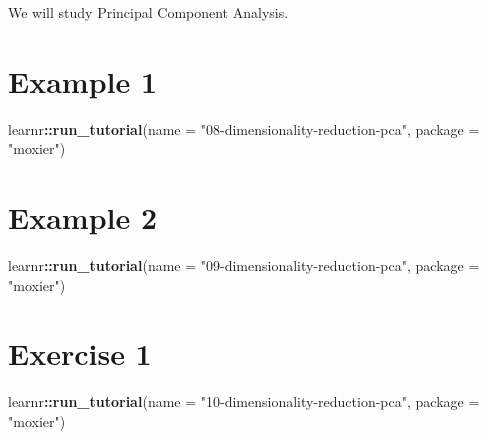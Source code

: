 \documentclass[]{book}
\newenvironment{Shaded}{\begin{snugshade}}{\end{snugshade}}
\newcommand{\KeywordTok}[1]{\textcolor[rgb]{0.13,0.29,0.53}{\textbf{#1}}}
\newcommand{\DataTypeTok}[1]{\textcolor[rgb]{0.13,0.29,0.53}{#1}}
\newcommand{\StringTok}[1]{\textcolor[rgb]{0.31,0.60,0.02}{#1}}
\newcommand{\OperatorTok}[1]{\textcolor[rgb]{0.81,0.36,0.00}{\textbf{#1}}}
\newcommand{\NormalTok}[1]{#1}
\begin{document}
We will study Principal Component Analysis.

\section{Example 1}\label{example-1}

\begin{Shaded}
\begin{Highlighting}[]
\NormalTok{learnr}\OperatorTok{::}\KeywordTok{run_tutorial}\NormalTok{(}\DataTypeTok{name =} \StringTok{"08-dimensionality-reduction-pca"}\NormalTok{,}
                     \DataTypeTok{package =} \StringTok{"moxier"}\NormalTok{)}
\end{Highlighting}
\end{Shaded}

\section{Example 2}\label{example-2}

\begin{Shaded}
\begin{Highlighting}[]
\NormalTok{learnr}\OperatorTok{::}\KeywordTok{run_tutorial}\NormalTok{(}\DataTypeTok{name =} \StringTok{"09-dimensionality-reduction-pca"}\NormalTok{,}
                     \DataTypeTok{package =} \StringTok{"moxier"}\NormalTok{)}
\end{Highlighting}
\end{Shaded}

\section{Exercise 1}\label{exercise-1}

\begin{Shaded}
\begin{Highlighting}[]
\NormalTok{learnr}\OperatorTok{::}\KeywordTok{run_tutorial}\NormalTok{(}\DataTypeTok{name =} \StringTok{"10-dimensionality-reduction-pca"}\NormalTok{,}
                     \DataTypeTok{package =} \StringTok{"moxier"}\NormalTok{)}
\end{Highlighting}
\end{Shaded}


\end{document}
